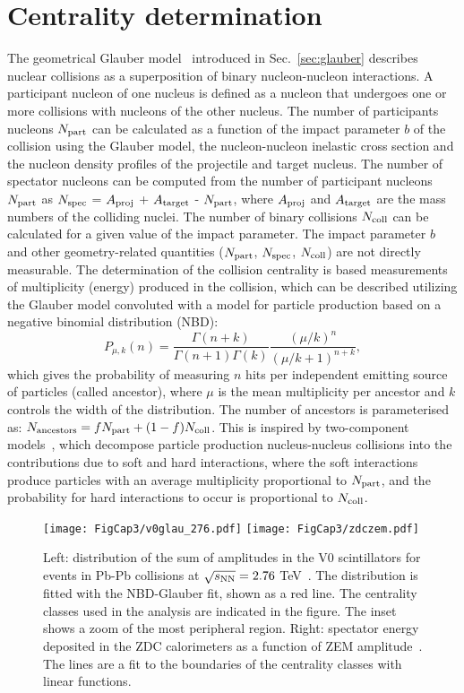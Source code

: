 \section{Centrality determination}
\label{sec:centr}
The geometrical Glauber model~\cite{Miller:2007ri} introduced in Sec.~\ref{sec:glauber} describes
nuclear collisions as a superposition of binary nucleon-nucleon interactions. 
A participant nucleon of one nucleus is defined as a nucleon that undergoes one or more 
 collisions with nucleons of the other nucleus. The number of participants nucleons $N_{\rm part}$
 can be calculated as a function of the impact parameter $b$ of the collision using the Glauber
 model, the nucleon-nucleon inelastic cross section and the nucleon density profiles of the projectile and target
 nucleus. The number of spectator nucleons can be computed from the number of participant nucleons 
$N_{\rm part}$ as $N_{\rm spec}$ = $A_{\rm proj}$ + $A_{\rm target}$ - $N_{\rm part}$, where $A_{\rm proj}$ and $A_{\rm target}$
are the mass numbers of the colliding nuclei. The number of binary 
collisions $N_{\rm coll}$ can be calculated for a given value of the impact parameter. 
The impact parameter $b$ and other geometry-related quantities ($N_{\rm part}$, 
$N_{\rm spec}$, $N_{\rm coll}$) are not directly measurable. The determination of the collision centrality is based 
measurements of multiplicity (energy) produced in the collision, which can be described utilizing
the Glauber model convoluted with a model for particle production based on a negative binomial distribution (NBD):
\begin{equation}
\label{eq:NBD}
P_{\mu, k} (n) = \frac{\Gamma(n+k)}{\Gamma(n+1)\Gamma(k)}\frac{(\mu/k)^n}{(\mu/k+1)^{n+k}},
\end{equation}
which gives the probability of measuring $n$ hits per independent emitting source of particles (called ancestor),
 where $\mu$ is the mean multiplicity per ancestor and $k$ controls the width of the distribution. 
The number of ancestors is parameterised as: $N_{\rm ancestors} = fN_{\rm part} + (1- f) N_{\rm coll}$.
This is inspired by two-component models~\cite{Deng:2010mv,Kharzeev:2004if}, which decompose particle production nucleus-nucleus 
collisions into the contributions due to soft and hard interactions, where the soft interactions produce particles with 
an average multiplicity proportional to $N_{\rm part}$, and the probability for hard interactions to occur is proportional to $N_{\rm coll}$. 
\begin{figure}[!h]
\centering
\texttt{[image: FigCap3/v0glau\_276.pdf]}
\texttt{[image: FigCap3/zdczem.pdf]}
\caption{Left: distribution of the sum of amplitudes in the V0 scintillators for events in Pb-Pb collisions at $\sqrt{s_{\rm NN}}=2.76$ TeV~\cite{Abelev:2013qoq}. The distribution is fitted with the NBD-Glauber fit, shown as a red line. The centrality classes used in the analysis are indicated in the figure. The inset shows a zoom of the most peripheral region. Right: spectator energy deposited in the ZDC calorimeters as a function of ZEM amplitude~\cite{Abelev:2013qoq}. The lines are a fit to the boundaries of the centrality classes with linear functions.}
\label{fig:centrality}
\end{figure}
